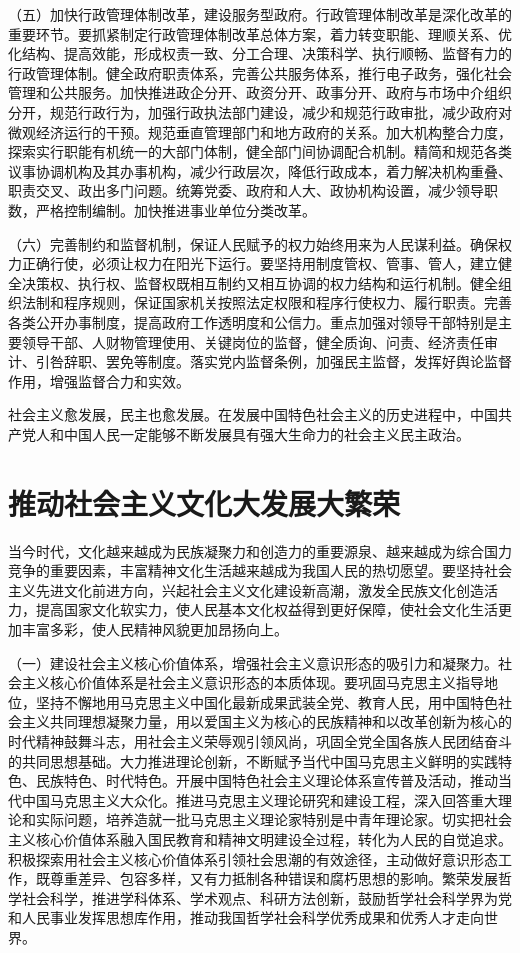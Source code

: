 （五）加快行政管理体制改革，建设服务型政府。行政管理体制改革是深化改革的重要环节。要抓紧制定行政管理体制改革总体方案，着力转变职能、理顺关系、优化结构、提高效能，形成权责一致、分工合理、决策科学、执行顺畅、监督有力的行政管理体制。健全政府职责体系，完善公共服务体系，推行电子政务，强化社会管理和公共服务。加快推进政企分开、政资分开、政事分开、政府与市场中介组织分开，规范行政行为，加强行政执法部门建设，减少和规范行政审批，减少政府对微观经济运行的干预。规范垂直管理部门和地方政府的关系。加大机构整合力度，探索实行职能有机统一的大部门体制，健全部门间协调配合机制。精简和规范各类议事协调机构及其办事机构，减少行政层次，降低行政成本，着力解决机构重叠、职责交叉、政出多门问题。统筹党委、政府和人大、政协机构设置，减少领导职数，严格控制编制。加快推进事业单位分类改革。

（六）完善制约和监督机制，保证人民赋予的权力始终用来为人民谋利益。确保权力正确行使，必须让权力在阳光下运行。要坚持用制度管权、管事、管人，建立健全决策权、执行权、监督权既相互制约又相互协调的权力结构和运行机制。健全组织法制和程序规则，保证国家机关按照法定权限和程序行使权力、履行职责。完善各类公开办事制度，提高政府工作透明度和公信力。重点加强对领导干部特别是主要领导干部、人财物管理使用、关键岗位的监督，健全质询、问责、经济责任审计、引咎辞职、罢免等制度。落实党内监督条例，加强民主监督，发挥好舆论监督作用，增强监督合力和实效。

社会主义愈发展，民主也愈发展。在发展中国特色社会主义的历史进程中，中国共产党人和中国人民一定能够不断发展具有强大生命力的社会主义民主政治。

\section{推动社会主义文化大发展大繁荣}

当今时代，文化越来越成为民族凝聚力和创造力的重要源泉、越来越成为综合国力竞争的重要因素，丰富精神文化生活越来越成为我国人民的热切愿望。要坚持社会主义先进文化前进方向，兴起社会主义文化建设新高潮，激发全民族文化创造活力，提高国家文化软实力，使人民基本文化权益得到更好保障，使社会文化生活更加丰富多彩，使人民精神风貌更加昂扬向上。

（一）建设社会主义核心价值体系，增强社会主义意识形态的吸引力和凝聚力。社会主义核心价值体系是社会主义意识形态的本质体现。要巩固马克思主义指导地位，坚持不懈地用马克思主义中国化最新成果武装全党、教育人民，用中国特色社会主义共同理想凝聚力量，用以爱国主义为核心的民族精神和以改革创新为核心的时代精神鼓舞斗志，用社会主义荣辱观引领风尚，巩固全党全国各族人民团结奋斗的共同思想基础。大力推进理论创新，不断赋予当代中国马克思主义鲜明的实践特色、民族特色、时代特色。开展中国特色社会主义理论体系宣传普及活动，推动当代中国马克思主义大众化。推进马克思主义理论研究和建设工程，深入回答重大理论和实际问题，培养造就一批马克思主义理论家特别是中青年理论家。切实把社会主义核心价值体系融入国民教育和精神文明建设全过程，转化为人民的自觉追求。积极探索用社会主义核心价值体系引领社会思潮的有效途径，主动做好意识形态工作，既尊重差异、包容多样，又有力抵制各种错误和腐朽思想的影响。繁荣发展哲学社会科学，推进学科体系、学术观点、科研方法创新，鼓励哲学社会科学界为党和人民事业发挥思想库作用，推动我国哲学社会科学优秀成果和优秀人才走向世界。

